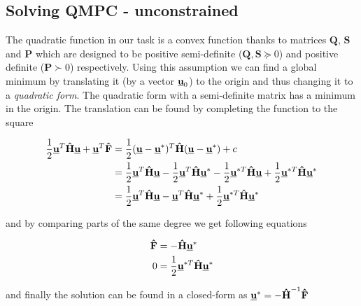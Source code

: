 \subsection{Solving QMPC - unconstrained}
\label{cap:qmpc_unconstrained}

The quadratic function in our task is a convex function thanks to matrices $\textbf{Q}$, $\textbf{S}$ and $\textbf{P}$ which are designed to be positive semi-definite ($\textbf{Q}, \textbf{S} \succeq 0$) and positive definite ($\textbf{P} \succ 0$) respectively. Using this assumption we can find a global minimum by translating it (by a vector $\textbf{\underline{u}}_{0}$) to the origin and thus changing it to a \textit{quadratic form}. The quadratic form with a semi-definite matrix has a minimum in the origin. The translation can be found by completing the function to the square

\begin{equation}
\begin{split}
\frac{1}{2}\textbf{\underline{u}}^T\textbf{\^H}\textbf{\underline{u}} + \textbf{\underline{u}}^T\textbf{\^F} &= \frac{1}{2}(\textbf{\underline{u}} - \textbf{\underline{u}}^*)^T\textbf{\^H}(\textbf{\underline{u}} - \textbf{\underline{u}}^*) + c\\
&= \frac{1}{2}\textbf{\underline{u}}^T\textbf{\^H}\textbf{\underline{u}} - \frac{1}{2}\textbf{\underline{u}}^T\textbf{\^H}\textbf{\underline{u}}^* - \frac{1}{2}\textbf{\underline{u}}^{*T}\textbf{\^H}\textbf{\underline{u}} + \frac{1}{2}\textbf{\underline{u}}^{*T}\textbf{\^H}\textbf{\underline{u}}^* \\
&= \frac{1}{2}\textbf{\underline{u}}^T\textbf{\^H}\textbf{\underline{u}} -
\textbf{\underline{u}}^T\textbf{\^H}\textbf{\underline{u}}^* + \frac{1}{2}\textbf{\underline{u}}^{*T}\textbf{\^H}\textbf{\underline{u}}^*
\end{split}
\end{equation}

and by comparing parts of the same degree we get following equations

\begin{equation}
\begin{split}
\textbf{\^F} &= -\textbf{\^H}\textbf{\underline{u}}^* \\
0 &= \frac{1}{2}\textbf{\underline{u}}^{*T}\textbf{\^H}\textbf{\underline{u}}^*
\end{split}
\end{equation}

and finally the solution can be found in a closed-form as $\textbf{\underline{u}}^* = -\textbf{\^H}^{-1}\textbf{\^F}$

